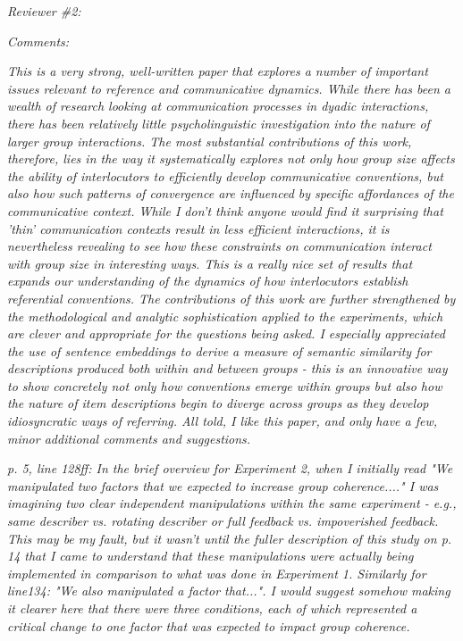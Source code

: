 \documentclass{stanfordletter}
\newcommand{\theysaid}[1]{\begin{leftbar} \noindent 
		\textsl{ #1}\end{leftbar}}
\begin{document}
\begin{letter}{}
          \theysaid{Reviewer \#2:}
          \theysaid{Comments:}
          \theysaid{This is a very strong, well-written paper that explores a number of important issues relevant to reference and communicative dynamics. While there has been a wealth of research looking at communication processes in dyadic interactions, there has been relatively little psycholinguistic investigation into the nature of larger group interactions. The most substantial contributions of this work, therefore, lies in the way it systematically explores not only how group size affects the ability of interlocutors to efficiently develop communicative conventions, but also how such patterns of convergence are influenced by specific affordances of the communicative context. While I don't think anyone would find it surprising that 'thin' communication contexts result in less efficient interactions, it is nevertheless revealing to see how these constraints on communication interact with group size in interesting ways. This is a really nice set of results that expands our understanding of the dynamics of how interlocutors establish referential conventions. The contributions of this work are further strengthened by the methodological and analytic sophistication applied to the experiments, which are clever and appropriate for the questions being asked. I especially appreciated the use of sentence embeddings to derive a measure of semantic similarity for descriptions produced both within and between groups - this is an innovative way to show concretely not only how conventions emerge within groups but also how the nature of item descriptions begin to diverge across groups as they develop idiosyncratic ways of referring. All told, I like this paper, and only have a few, minor additional comments and suggestions.}
          
          
          \theysaid{p. 5, line 128ff: In the brief overview for Experiment 2, when I initially read "We manipulated two factors that we expected to increase group coherence...." I was imagining two clear independent manipulations within the same experiment - e.g., same describer vs. rotating describer or full feedback vs. impoverished feedback. This may be my fault, but it wasn't until the fuller description of this study on p. 14 that I came to understand that these manipulations were actually being implemented in comparison to what was done in Experiment 1. Similarly for line134: "We also manipulated a factor that...". I would suggest somehow making it clearer here that there were three conditions, each of which represented a critical change to one factor that was expected to impact group coherence.}


\end{letter}
\end{document}
